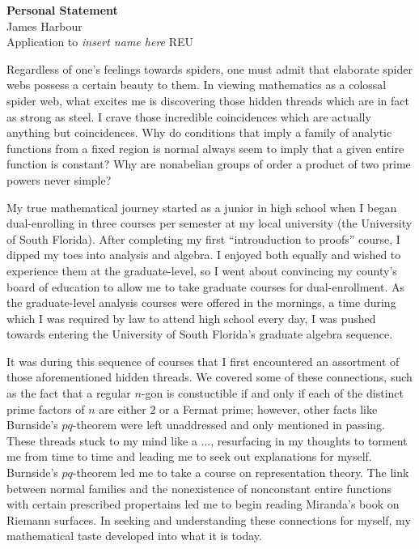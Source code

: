 \documentclass[12pt]{article}
\begin{document}
\begin{center}
  \textbf{Personal Statement}\\
  James Harbour \\
  Application to \emph{insert name here} REU
\end{center}


Regardless of one's feelings towards spiders, one must admit that elaborate spider webs possess a certain beauty to them. In viewing mathematics as a colossal spider web, what excites me is discovering those hidden threads which are in fact as strong as steel. I crave those incredible coincidences which are actually anything but coincidences. Why do conditions that imply a family of analytic functions from a fixed region is normal always seem to imply that a given entire function is constant? Why are nonabelian groups of order a product of two prime powers never simple?








My true mathematical journey started as a junior in high school when I began dual-enrolling in three courses per semester at my local university (the University of South Florida). After completing my first ``introuduction to proofs'' course, I dipped my toes into analysis and algebra. I enjoyed both equally and wished to experience them at the graduate-level, so I went about convincing my county's board of education to allow me to take graduate courses for dual-enrollment. As the graduate-level analysis courses were offered in the mornings, a time during which I was required by law to attend high school every day, I was pushed towards entering the University of South Florida's graduate algebra sequence.

It was during this sequence of courses that I first encountered an assortment of those aforementioned hidden threads. We covered some of these connections, such as the fact that a regular $n$-gon is constuctible if and only if each of the distinct prime factors of $n$ are either $2$ or a Fermat prime; however, other facts like Burnside's $pq$-theorem were left unaddressed and only mentioned in passing. These threads stuck to my mind like a ..., resurfacing in my thoughts to torment me from time to time and leading me to seek out explanations for myself. Burnside's $pq$-theorem led me to take a course on representation theory. The link between normal families and the nonexistence of nonconstant entire functions with certain prescribed propertains led me to begin reading Miranda's book on Riemann surfaces. In seeking and understanding these connections for myself, my mathematical taste developed into what it is today.
\end{document}
